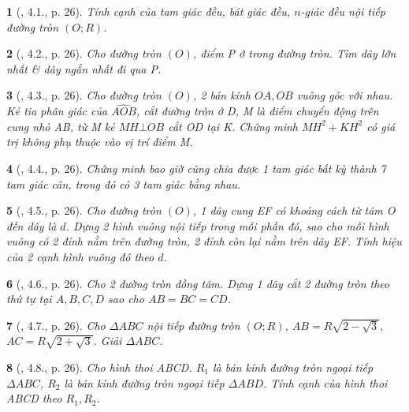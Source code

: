 \documentclass{article}
\newtheorem{baitoan}{}
\begin{document}
\begin{baitoan}[\cite{TLCT_THCS_Toan_9_hinh_hoc}, 4.1., p. 26]
	Tính cạnh của tam giác đều, bát giác đều, $n$-giác đều nội tiếp đường tròn $(O;R)$.
\end{baitoan}

\begin{baitoan}[\cite{TLCT_THCS_Toan_9_hinh_hoc}, 4.2., p. 26]
	Cho đường tròn $(O)$, điểm P ở trong đường tròn. Tìm dây lớn nhất \& dây ngắn nhất đi qua P.
\end{baitoan}

\begin{baitoan}[\cite{TLCT_THCS_Toan_9_hinh_hoc}, 4.3., p. 26]
	Cho đường tròn $(O)$, 2 bán kính $OA,OB$ vuông góc với nhau. Kẻ tia phân giác của $\widehat{AOB}$, cắt đường tròn ở D, M là điểm chuyển động trên cung nhỏ AB, từ M kẻ $MH\bot OB$ cắt OD tại K. Chứng minh $MH^2 + KH^2$ có giá trị không phụ thuộc vào vị trí điểm M.
\end{baitoan}

\begin{baitoan}[\cite{TLCT_THCS_Toan_9_hinh_hoc}, 4.4., p. 26]
	Chứng minh bao giờ cũng chia được 1 tam giác bất kỳ thành 7 tam giác cân, trong đó có 3 tam giác bằng nhau.
\end{baitoan}

\begin{baitoan}[\cite{TLCT_THCS_Toan_9_hinh_hoc}, 4.5., p. 26]
	Cho đường tròn $(O)$, 1 dây cung EF có khoảng cách từ tâm O đến dây là $d$. Dựng 2 hình vuông nội tiếp trong mỗi phần đó, sao cho mỗi hình vuông có 2 đỉnh nằm trên đường tròn, 2 đỉnh còn lại nằm trên dây EF. Tính hiệu của 2 cạnh hình vuông đó theo $d$.
\end{baitoan}

\begin{baitoan}[\cite{TLCT_THCS_Toan_9_hinh_hoc}, 4.6., p. 26]
	Cho 2 đường tròn đồng tâm. Dựng 1 dây cắt 2 đường tròn theo thứ tự tại $A,B,C,D$ sao cho $AB = BC = CD$.
\end{baitoan}

\begin{baitoan}[\cite{TLCT_THCS_Toan_9_hinh_hoc}, 4.7., p. 26]
	Cho $\Delta ABC$ nội tiếp đường tròn $(O;R)$, $AB = R\sqrt{2 - \sqrt{3}}$, $AC = R\sqrt{2 + \sqrt{3}}$. Giải $\Delta ABC$.
\end{baitoan}

\begin{baitoan}[\cite{TLCT_THCS_Toan_9_hinh_hoc}, 4.8., p. 26]
	Cho hình thoi ABCD. $R_1$ là bán kính đường tròn ngoại tiếp $\Delta ABC$, $R_2$ là bán kính đường tròn ngoại tiếp $\Delta ABD$. Tính cạnh của hình thoi ABCD theo $R_1,R_2$.
\end{baitoan}
\end{document}

